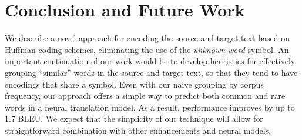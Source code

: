 \section{Conclusion and Future Work}
\label{sec:conclusion}

We describe a novel approach for encoding the source and target text based on
Huffman coding schemes, eliminating the use of the \emph{unknown word} symbol.
An important continuation of our work would be to develop heuristics for
effectively grouping ``similar'' words in the source and target text, so that
they tend to have encodings that share a symbol. Even with our naive grouping
by corpus frequency, our approach offers a simple way to predict both common
and rare words in a neural translation model. As a result, performance improves
by up to 1.7 BLEU. We expect that the simplicity of our technique will allow
for straightforward combination with other enhancements and neural models.

